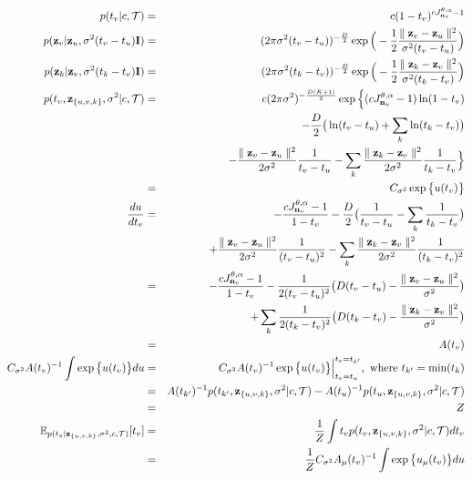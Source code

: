 \documentclass{article}
\begin{document}
	\begin{eqnarray}
	p(t_v | c, \mathcal{T}) &=& c(1-t_v)^{cJ^{\theta,\alpha}_{\bold{n}_v} - 1} \\
	p(\bold{z}_v | \bold{z}_u, \sigma^2(t_v - t_u)\bold{I}) &=& (2 \pi \sigma^2(t_v - t_u))^{-\frac{D}{2}} \exp \Big(-\frac{1}{2}\frac{\parallel \bold{z}_v - \bold{z}_u \parallel^2}{\sigma^2 (t_v - t_u)} \Big)\\
	p(\bold{z}_k | \bold{z}_v, \sigma^2(t_k - t_v)\bold{I}) &=& (2 \pi \sigma^2(t_k - t_v))^{-\frac{D}{2}} \exp \Big(-\frac{1}{2}\frac{\parallel \bold{z}_k - \bold{z}_v \parallel^2}{\sigma^2 (t_k - t_v)} \Big)\\
	p(t_v, \bold{z}_{\{u,v,k\}}, \sigma^2 | c, \mathcal{T}) & = & c(2 \pi \sigma^2)^{-\frac{D(K + 1)}{2}}\exp \Big\{(cJ^{\theta,\alpha}_{\bold{n}_v} - 1)\ln(1 - t_v) \nonumber \\
	 & & - \frac{D}{2} \big( \ln(t_v - t_u) + \sum_k \ln(t_k - t_v) \big) \nonumber \\
	 & & - \frac{\parallel \bold{z}_v - \bold{z}_u\parallel^2}{2\sigma^2}\frac{1}{t_v - t_u} - \sum_k \frac{\parallel \bold{z}_k - \bold{z}_v\parallel^2}{2\sigma^2}\frac{1}{t_k - t_v} \Big\}  \nonumber\\
	 &=& C_{\sigma^2} \exp \big\{ u(t_v) \big\}\\
	\frac{du}{dt_v} &=& -\frac{cJ^{\theta,\alpha}_{\bold{n}_v} - 1}{1 - t_v} - \frac{D}{2}\big( \frac{1}{t_v - t_u} - \sum_k\frac{1}{t_k - t_v}\big) \nonumber \\
	 & & + \frac{\parallel \bold{z}_v - \bold{z}_u\parallel^2}{2\sigma^2}\frac{1}{(t_v - t_u)^2} - \sum_k \frac{\parallel \bold{z}_k - \bold{z}_v\parallel^2}{2\sigma^2}\frac{1}{(t_k - t_v)^2} \nonumber \\
	 &=& -\frac{cJ^{\theta,\alpha}_{\bold{n}_v} - 1}{1 - t_v} - \frac{1}{2(t_v - t_u)^2} \big(D(t_v - t_u) - \frac{\parallel \bold{z}_v - \bold{z}_u\parallel^2}{\sigma^2} \big) \nonumber \\
	 & & + \sum_k \frac{1}{2(t_k - t_v)^2} \big(D(t_k - t_v) - \frac{\parallel \bold{z}_k - \bold{z}_v\parallel^2}{\sigma^2} \big) \nonumber \\
	 &=& A(t_v)\\
	 C_{\sigma^2} A(t_v)^{-1} \int \exp \big\{u(t_v)\big\}du &=& C_{\sigma^2} A(t_v)^{-1} \exp \big\{u(t_v)\big\}\Big\vert^{t_v = t_{k'}}_{t_v = t_u} ,\textrm{ where } t_{k'} = \min(t_k) \nonumber \\
	 &=& A(t_{k'})^{-1}p(t_{k'}, \bold{z}_{\{u,v,k\}}, \sigma^2 | c, \mathcal{T}) - A(t_{u})^{-1}p(t_{u}, \bold{z}_{\{u,v,k\}}, \sigma^2 | c, \mathcal{T})\nonumber \\
	 &=& Z \\
	\mathbb{E}_{p(t_v | \bold{z}_{\{u,v,k\}}, \sigma^2, c, \mathcal{T})}[t_v] &=& \frac{1}{Z} \int t_v p(t_v, \bold{z}_{\{u,v,k\}}, \sigma^2 | c, \mathcal{T}) dt_v \nonumber \\
	&=& \frac{1}{Z} C_{\sigma^2} A_\mu(t_v)^{-1} \int \exp \big\{ u_\mu(t_v)\big\}du
	\end{eqnarray}
	
\end{document}
